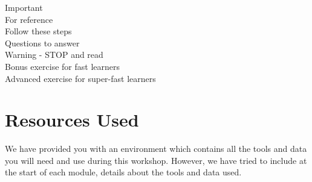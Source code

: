 \hspace*{.2cm} Important\\
\hspace*{.2cm} For reference\\
\hspace*{.2cm} Follow these steps\\
\hspace*{.2cm} Questions to answer\\
\hspace*{.2cm} Warning - STOP and read\\
\hspace*{.2cm} Bonus exercise for fast learners\\
\hspace*{.2cm} Advanced exercise for super-fast learners\\

\section{Resources Used}
We have provided you with an environment which contains all the tools and data
you will need and use during this workshop. However, we have tried to include at
the start of each module, details about the tools and data used.
